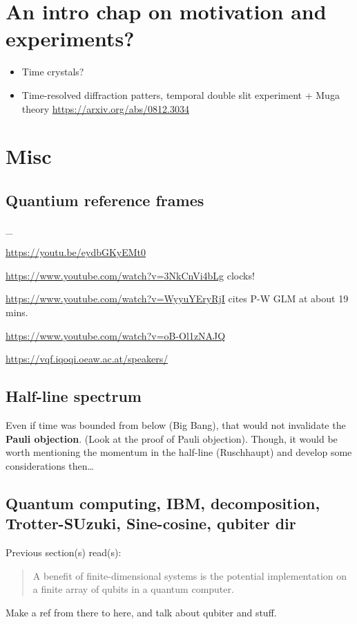 \section{An intro chap on motivation and experiments?}
\begin{itemize}
  \item Time crystals?
  \item Time-resolved diffraction patters, temporal double slit experiment + Muga theory \url{https://arxiv.org/abs/0812.3034}
\end{itemize}


\section{Misc}

\subsection{Quantium reference frames}

\_

\url{https://youtu.be/eydbGKyEMt0}

\url{https://www.youtube.com/watch?v=3NkCnVi4bLg} clocks!

\url{https://www.youtube.com/watch?v=WyyuYEryRjI} cites P-W GLM at about 19 mins.

\url{https://www.youtube.com/watch?v=oB-Ol1zNAJQ}

\url{https://vqf.iqoqi.oeaw.ac.at/speakers/}


\subsection{Half-line spectrum}
Even if time was bounded from below (Big Bang), that would not invalidate the \textbf{Pauli objection}.
(Look at the proof of Pauli objection).
Though, it would be worth mentioning the momentum in the half-line (Ruschhaupt)
and develop some considerations then\dots


\subsection{Quantum computing, IBM, decomposition, Trotter-SUzuki, Sine-cosine, qubiter dir}

Previous section(s) read(s):
\begin{quote}
  A benefit of finite-dimensional systems is the potential implementation on a finite array of
  qubits in a quantum computer.
\end{quote}
Make a ref from there to here, and talk about qubiter and stuff.

